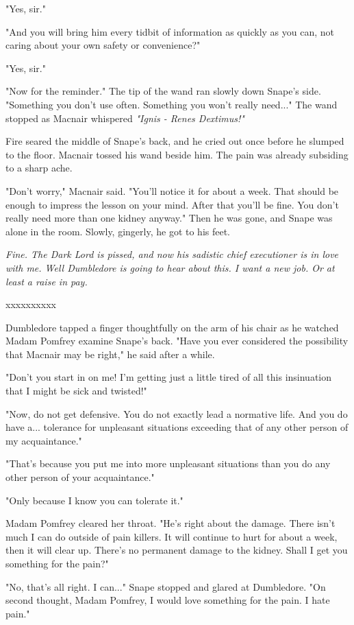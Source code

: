 \documentclass[a4paper,11pt]{article}
\begin{document}
"Yes, sir."

"And you will bring him every tidbit of information as quickly as you can, not caring about your own safety or convenience?"

"Yes, sir."

"Now for the reminder." The tip of the wand ran slowly down Snape's side. "Something you don't use often. Something you won't really need..." The wand stopped as Macnair whispered \emph{"Ignis - Renes Dextimus!"}

Fire seared the middle of Snape's back, and he cried out once before he slumped to the floor. Macnair tossed his wand beside him. The pain was already subsiding to a sharp ache.

"Don't worry," Macnair said. "You'll notice it for about a week. That should be enough to impress the lesson on your mind. After that you'll be fine. You don't really need more than one kidney anyway." Then he was gone, and Snape was alone in the room. Slowly, gingerly, he got to his feet.

\emph{Fine. The Dark Lord is pissed, and now his sadistic chief executioner is in love with me. Well Dumbledore is going to hear about this. I want a new job. Or at least a raise in pay.}

xxxxxxxxxx

Dumbledore tapped a finger thoughtfully on the arm of his chair as he watched Madam Pomfrey examine Snape's back. "Have you ever considered the possibility that Macnair may be right," he said after a while.

"Don't you start in on me! I'm getting just a little tired of all this insinuation that I might be sick and twisted!"

"Now, do not get defensive. You do not exactly lead a normative life. And you do have a... tolerance for unpleasant situations exceeding that of any other person of my acquaintance."

"That's because you put me into more unpleasant situations than you do any other person of your acquaintance."

"Only because I know you can tolerate it."

Madam Pomfrey cleared her throat. "He's right about the damage. There isn't much I can do outside of pain killers. It will continue to hurt for about a week, then it will clear up. There's no permanent damage to the kidney. Shall I get you something for the pain?"

"No, that's all right. I can..." Snape stopped and glared at Dumbledore. "On second thought, Madam Pomfrey, I would love something for the pain. I hate pain."
\end{document}
